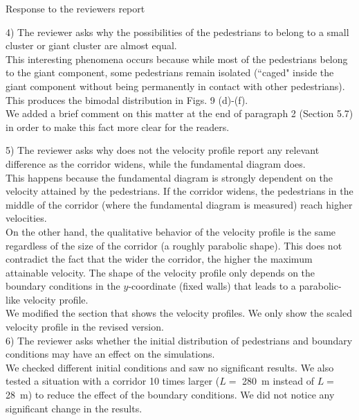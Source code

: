 \documentclass[a4paper,12pt]{letter}
\begin{document}
\begin{letter}{Response to the reviewers report}
{4) The reviewer asks why the possibilities of the pedestrians to belong to a small cluster or giant cluster are almost equal. \\

This interesting phenomena occurs because while most of the pedestrians belong to the giant component, some pedestrians remain isolated (``caged" inside the giant component without being permanently in contact with other pedestrians). This produces the bimodal distribution in Figs. 9 (d)-(f).\\

We added a brief comment on this matter at the end of paragraph 2 (Section 5.7) in order to make this fact more clear for the readers.   

5) The reviewer asks why does not the velocity profile report any relevant difference as the corridor widens, while the fundamental diagram does.\\

This happens because the fundamental diagram is strongly dependent on the velocity attained by the pedestrians. If the corridor widens, the pedestrians in the middle of the corridor (where the fundamental diagram is measured) reach higher velocities. \\

On the other hand, the qualitative behavior of the velocity profile is the same regardless of the size of the corridor (a roughly parabolic shape). This does not contradict the fact that the wider the corridor, the higher the maximum attainable velocity. The shape of the velocity profile only depends on the boundary conditions in the $y$-coordinate (fixed walls) that leads to a parabolic-like velocity profile. \\

We modified the section that shows the velocity profiles.  We only show the scaled velocity profile in the revised version. \\

6) The reviewer asks whether the initial distribution of pedestrians and boundary conditions may have an effect on the simulations.\\

We checked different initial conditions and saw no significant results. We also tested a situation with a corridor 10 times larger ($L =$ 280~m instead of $L =$ 28~m) to reduce the effect of the boundary conditions. We did not notice any significant change in the results. \\

}
\end{letter}
\end{document}
